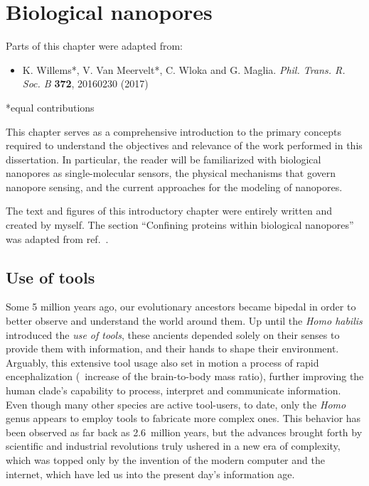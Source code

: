 \chapter{Biological nanopores}
%
\label{ch:nanopores}
%



%
%
\begin{shaded}
Parts of this chapter were adapted from:
%
\begin{itemize}
  \item K. Willems*, V. Van Meervelt*, C. Wloka and G. Maglia.
        \textit{Phil. Trans. R. Soc. B} \textbf{372}, 20160230 (2017) %
\end{itemize}
%
*equal contributions
%
\newpage
\end{shaded}
%
%

%
This chapter serves as a comprehensive introduction to the primary concepts required to understand the
objectives and relevance of the work performed in this dissertation. In particular, the reader will be
familiarized with biological nanopores as single-molecular sensors, the physical mechanisms that govern
nanopore sensing, and the current approaches for the modeling of nanopores.
%

%
The text and figures of this introductory chapter were entirely written and created by myself.
%
The section
%
``Confining proteins within biological nanopores''
%
was adapted from ref.~\cite{Willems-VanMeervelt-2017}.



\clearpage

%
%
\section{Use of tools}
%

Some 5 million years ago, our evolutionary ancestors became bipedal in order to better observe and understand
the world around them. Up until the \textit{Homo habilis} introduced the \emph{use of tools}, these ancients
depended solely on their senses to provide them with information, and their hands to shape their environment.
Arguably, this extensive tool usage also set in motion a process of rapid encephalization (\ie~increase of the
brain-to-body mass ratio), further improving the human clade's capability to process, interpret and
communicate information. Even though many other species are active tool-users, to date, only the \textit{Homo}
genus appears to employ tools to fabricate more complex ones. This behavior has been observed as far back as
2.6~million years, but the advances brought forth by scientific and industrial revolutions truly ushered in a
new era of complexity, which was topped only by the invention of the modern computer and the internet, which have led us into the present day's information age.


